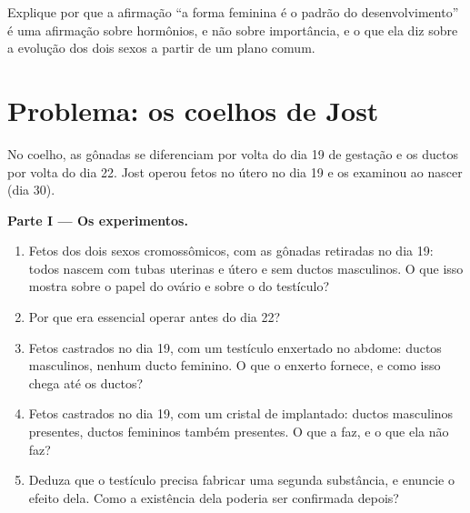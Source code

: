 \begin{exercise}[$\star\star\star$]\label{exo:g11:becoming-male-female:15}
Explique por que a afirmação ``a forma feminina é o padrão do
desenvolvimento'' é uma afirmação sobre hormônios, e não sobre
importância, e o que ela diz sobre a evolução dos dois sexos a partir
de um plano comum.
\end{exercise}

\section{Problema: os coelhos de Jost}

\begin{problem}
\label{pb:g11:becoming-male-female:1}
No coelho, as gônadas se diferenciam por volta do dia 19 de gestação e
os ductos por volta do dia 22. Jost operou fetos no útero no dia 19 e os
examinou ao nascer (dia 30).

\medskip
\noindent\textbf{Parte I --- Os experimentos.}
\begin{enumerate}
  \item Fetos dos dois sexos cromossômicos, com as gônadas retiradas no
        dia 19: todos nascem com tubas uterinas e útero e sem ductos
        masculinos. O que isso mostra sobre o papel do ovário e sobre o
        do testículo?
  \item Por que era essencial operar antes do dia 22?
  \item Fetos castrados no dia 19, com um testículo enxertado no
        abdome: ductos masculinos, nenhum ducto feminino. O que o
        enxerto fornece, e como isso chega até os ductos?
  \item Fetos castrados no dia 19, com um cristal de 
        implantado: ductos masculinos presentes, ductos femininos
        também presentes. O que a  faz, e o que ela não faz?
  \item Deduza que o testículo precisa fabricar uma segunda substância,
        e enuncie o efeito dela. Como a existência dela poderia ser
        confirmada depois?
\end{enumerate}


\end{problem}
